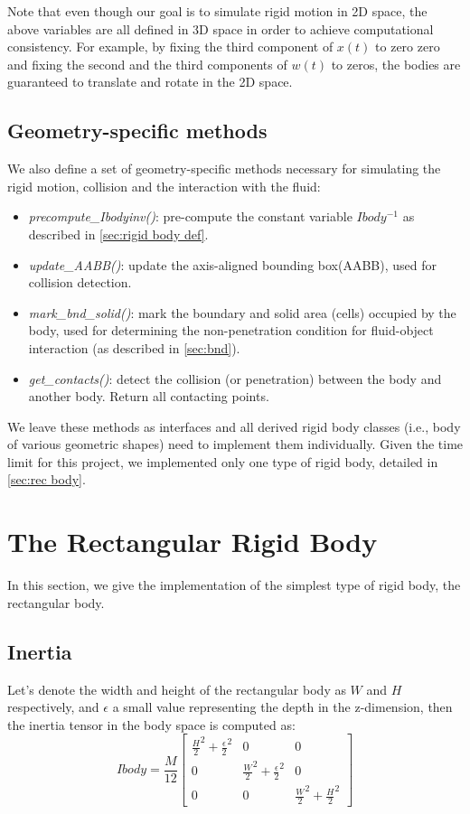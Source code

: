 Note that even though our goal is to simulate rigid motion in 2D space, the above variables are all defined in 3D space in order to achieve computational consistency. For example, by fixing the third component of $x(t)$ to zero zero and fixing the second and the third components of $w(t)$ to zeros, the bodies are guaranteed to translate and rotate in the 2D space. 
\subsection{Geometry-specific methods}
We also define a set of geometry-specific methods necessary for simulating the rigid motion, collision and the interaction with the fluid:
\begin{itemize}
    \item \emph{precompute\_Ibodyinv()}: pre-compute the constant variable $Ibody^{-1}$ as described in \autoref{sec:rigid body def}.
    \item \emph{update\_AABB()}: update the axis-aligned bounding box(AABB), used for collision detection.  
    \item \emph{mark\_bnd\_solid()}: mark the boundary and solid area (cells) occupied by the body, used for determining the non-penetration condition for fluid-object interaction (as described in \autoref{sec:bnd}).
    \item \emph{get\_contacts()}: detect the collision (or penetration) between the body and another body. Return all contacting points.
\end{itemize}
We leave these methods as interfaces and all derived rigid body classes (i.e., body of various geometric shapes) need to implement them individually. Given the time limit for this project, we implemented only one type of rigid body, detailed in \autoref{sec:rec body}.

\section{The Rectangular Rigid Body}
\label{sec:rec body}
In this section, we give the implementation of the simplest type of rigid body, the rectangular body.
\subsection{Inertia}
Let's denote the width and height of the rectangular body as $W$ and $H$ respectively, and $\epsilon$ a small value representing the depth in the z-dimension, then the inertia tensor in the body space is computed as:
\begin{equation*}
Ibody=\frac{M}{12}\begin{bmatrix}
    \frac{H}{2}^2+\frac{\epsilon}{2}^2 & 0 & 0 \\
    0 & \frac{W}{2}^2+\frac{\epsilon}{2}^2 & 0 \\
    0 & 0 & \frac{W}{2}^2+\frac{H}{2}^2
\end{bmatrix}
\end{equation*}
